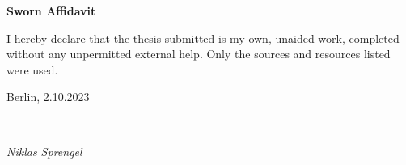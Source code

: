 \newpage

\thispagestyle{empty}

\begin{large}
\vspace*{1.4cm}
\noindent
\begin{center}
{\Large \textbf{Sworn Affidavit}}
\end{center}

\vspace*{0.5cm}

\noindent
I hereby declare that the thesis submitted is my own, unaided work, completed without any unpermitted external
help. Only the sources and resources listed were used.
\vspace{1cm}

\noindent
Berlin, 2.10.2023

\vspace{3cm}

\hspace*{7cm}%
\dotfill\\
\hspace*{8.5cm}%
\begin{flushright}
\textit{Niklas Sprengel}
\end{flushright}

\end{large}
